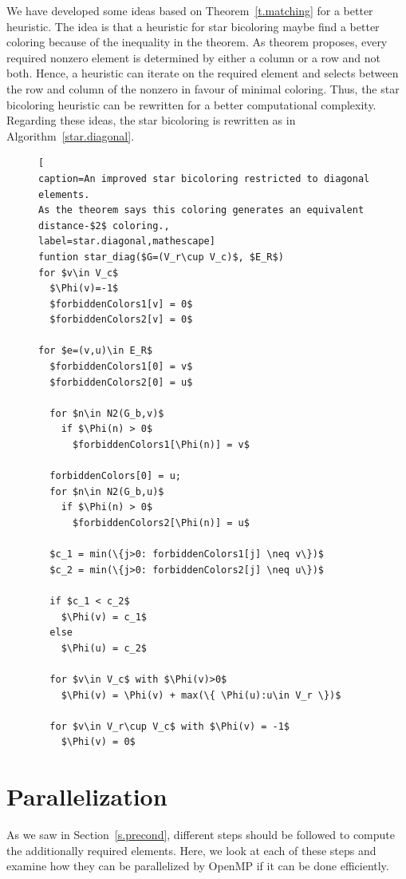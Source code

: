 \documentclass[11pt, twoside,a4paper]{book}
\newcommand{\secref}[1]{Section~\protect\ref{#1}}
\newcommand{\coderef}[1]{Algorithm~\protect\ref{#1}}
\begin{document}
We have developed some ideas based on Theorem~\ref{t.matching}
for a better heuristic. The idea is that a heuristic for star bicoloring maybe
find a better coloring because of the inequality in the theorem.
As theorem proposes, every required nonzero element
is determined by either a column or a row and not both. Hence, a heuristic
can iterate on the required element and selects between the row and column of
the nonzero in favour of minimal coloring.
Thus, the star bicoloring heuristic can be rewritten for a better computational complexity.
Regarding these ideas, the star bicoloring is rewritten as in \coderef{star.diagonal}.
\begin{figure}
\begin{lstlisting}[
caption=An improved star bicoloring restricted to diagonal elements.
As the theorem says this coloring generates an equivalent distance-$2$ coloring.,
label=star.diagonal,mathescape]
funtion star_diag($G=(V_r\cup V_c)$, $E_R$)
for $v\in V_c$
  $\Phi(v)=-1$
  $forbiddenColors1[v] = 0$
  $forbiddenColors2[v] = 0$

for $e=(v,u)\in E_R$
  $forbiddenColors1[0] = v$
  $forbiddenColors2[0] = u$

  for $n\in N2(G_b,v)$
    if $\Phi(n) > 0$
      $forbiddenColors1[\Phi(n)] = v$

  forbiddenColors[0] = u;
  for $n\in N2(G_b,u)$
    if $\Phi(n) > 0$
      $forbiddenColors2[\Phi(n)] = u$

  $c_1 = min(\{j>0: forbiddenColors1[j] \neq v\})$
  $c_2 = min(\{j>0: forbiddenColors2[j] \neq u\})$

  if $c_1 < c_2$
    $\Phi(v) = c_1$
  else
    $\Phi(u) = c_2$

  for $v\in V_c$ with $\Phi(v)>0$
    $\Phi(v) = \Phi(v) + max(\{ \Phi(u):u\in V_r \})$

  for $v\in V_r\cup V_c$ with $\Phi(v) = -1$
    $\Phi(v) = 0$
\end{lstlisting}
\end{figure}
\section{Parallelization}
\label{s.parallel}
As we saw in \secref{s.precond}, different steps should be followed
to compute the additionally required elements. Here, we look at each of
these steps and examine how they can be parallelized by OpenMP
if it can be done efficiently.
\end{document}
